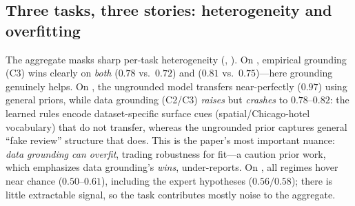 \subsection{Three tasks, three stories: heterogeneity and overfitting}
\label{sec:res-pertask}

The aggregate masks sharp per-task heterogeneity (,
). On \dreaddit, empirical grounding (C3) wins clearly on
\emph{both} \IND{} ($0.78$ vs.\ $0.72$) and \OOD{} ($0.81$ vs.\ $0.75$)---here
grounding genuinely helps. On \deceptive, the ungrounded model transfers
near-perfectly \OOD{} ($0.97$) using general priors, while data grounding (C2/C3)
\emph{raises} \IND{} but \emph{crashes} \OOD{} to $0.78$--$0.82$: the learned rules
encode dataset-specific surface cues (\eg spatial/Chicago-hotel vocabulary) that do
not transfer, whereas the ungrounded prior captures general ``fake review'' structure
that does. This is the paper's most important nuance: \emph{data grounding can overfit},
trading \OOD{} robustness for \IND{} fit---a caution prior work, which emphasizes data
grounding's \OOD{} \emph{wins}, under-reports. On \headline, all regimes hover near
chance ($0.50$--$0.61$), including the expert hypotheses ($0.56/0.58$); there is little
extractable signal, so the task contributes mostly noise to the aggregate.

\begin{table}[t]
\centering
\caption{Per-task accuracy (\IND{} / \OOD, mean over seeds) for selected regimes.
\textbf{Bold} marks the best \IND/\OOD{} on a task among the shown regimes. Three
distinct stories: grounding helps on \dreaddit, overfits on \deceptive{} (ungrounded
\OOD{} $0.97$ vs.\ grounded $\le 0.82$), and finds no signal on \headline.}
\label{tab:pertask}
\end{table}

